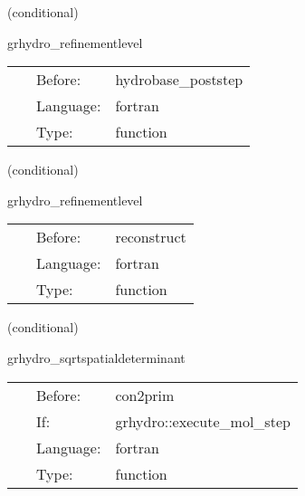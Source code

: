 \documentclass{article}
\begin{document}
\vspace{5mm}

   (conditional) 

\hspace{5mm} grhydro\_refinementlevel 

\hspace{5mm}{\it calculate current refinement level } 


\hspace{5mm}

 \begin{tabular*}{160mm}{cll} 
~ & Before:  & hydrobase\_poststep \\ 
~ & Language:  & fortran \\ 
~ & Type:  & function \\ 
\end{tabular*} 


\vspace{5mm}

   (conditional) 

\hspace{5mm} grhydro\_refinementlevel 

\hspace{5mm}{\it calculate current refinement level } 


\hspace{5mm}

 \begin{tabular*}{160mm}{cll} 
~ & Before:  & reconstruct \\ 
~ & Language:  & fortran \\ 
~ & Type:  & function \\ 
\end{tabular*} 


\vspace{5mm}

   (conditional) 

\hspace{5mm} grhydro\_sqrtspatialdeterminant 

\hspace{5mm}{\it calculate sdetg } 


\hspace{5mm}

 \begin{tabular*}{160mm}{cll} 
~ & Before:  & con2prim \\ 
~ & If:  & grhydro::execute\_mol\_step \\ 
~ & Language:  & fortran \\ 
~ & Type:  & function \\ 
\end{tabular*} 
\end{document}
